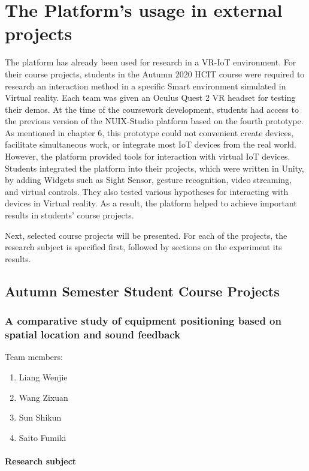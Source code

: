 
\chapter{The Platform's usage in external projects}
The platform has already been used for research in a VR-IoT environment.
For their course projects, students in the Autumn 2020 HCIT course were required to research an interaction method in a specific Smart environment simulated in Virtual reality. Each team was given an Oculus Quest 2 VR headset for testing their demos. At the time of the coursework development, students had access to the previous version of the NUIX-Studio platform based on the fourth prototype. As mentioned in chapter 6, this prototype could not convenient create devices, facilitate simultaneous work, or integrate most IoT devices from the real world. However, the platform provided tools for interaction with virtual IoT devices. Students integrated the platform into their projects, which were written in Unity, by adding Widgets such as Sight Sensor, gesture recognition, video streaming, and virtual controls. They also tested various hypotheses for interacting with devices in Virtual reality. As a result, the platform helped to achieve important results in students' course projects. 

Next, selected course projects will be presented. For each of the projects, the research subject is specified first, followed by sections on the experiment its results.

\section{Autumn Semester Student Course Projects}

\subsection{A comparative study of equipment positioning based on spatial location and sound feedback}

Team members:
\begin{enumerate}
    \item Liang Wenjie
    \item Wang Zixuan
    \item Sun Shikun
    \item Saito Fumiki
\end{enumerate}

\subsubsection{Research subject}

